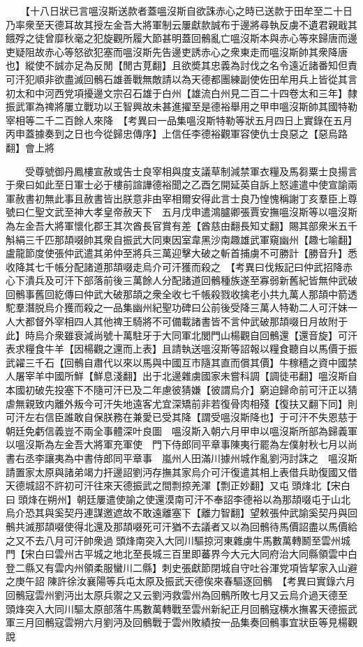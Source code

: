 　　【十八日狀已言嗢沒斯送款者蓋嗢沒斯自欲誅赤心之時已送款于田牟至二十日乃率衆至天德耳故其授左金吾大將軍制云屢獻款誠布于邊將尋執反虜不遺君親戢其餓殍之徒曾靡秋毫之犯旋觀所履大節甚明蓋回鶻亂亡嗢沒斯本與赤心等來歸唐而邊吏疑阻故赤心等怒欲犯塞而嗢沒斯先告邊吏誘赤心之衆東走而嗢沒斯帥其衆降唐也】縱使不誠亦足為反閒【閒古莧翻】且欲奬其忠義為討伐之名令遠近諸番知但責可汗犯順非欲盡滅回鶻石雄善戰無敵請以為天德都團練副使佐田牟用兵上皆從其言初太和中河西党項擾邊文宗召石雄于白州【雄流白州見二百二十四卷太和三年】隸振武軍為禆將屢立戰功以王智興故未甚進擢至是德裕舉用之甲申嗢沒斯帥其國特勒宰相等二千二百餘人來降　【考異曰一品集嗢沒斯特勒等狀五月四日上實錄在五月丙申蓋據奏到之日也今從歸忠傳序】上信任李德裕觀軍容使仇士良惡之【惡烏路翻】會上將

　　受尊號御丹鳳樓宣赦或告士良宰相與度支議草制減禁軍衣糧及馬芻粟士良揚言于衆曰如此至日軍士必于樓前諠譁德裕聞之乙酉乞開延英自訴上怒遽遣中使宣諭兩軍赦書初無此事且赦書皆出朕意非由宰相爾安得此言士良乃惶愧稱謝丁亥羣臣上尊號曰仁聖文武至神大孝皇帝赦天下　五月戊申遣鴻臚卿張賈安撫嗢沒斯等以嗢沒斯為左金吾大將軍懷化郡王其次酋長官賞有差【酋慈由翻長知丈翻】賜其部衆米五千斛絹三千匹那頡啜帥其衆自振武大同東因室韋黑沙南趣雄武軍窺幽州【趣七喻翻】盧龍節度使張仲武遣其弟仲至將兵三萬迎擊大破之斬首捕虜不可勝計【勝音升】悉收降其七千帳分配諸道那頡啜走烏介可汗獲而殺之　【考異曰伐叛記曰仲武招降赤心下潰兵及可汗下部落前後三萬餘人分配諸道回鶻種族遂至寡弱新舊紀皆無仲武破回鶻事舊回紇傳曰仲武大破那頡之衆全收七千帳殺戮收擒老小共九萬人那頡中箭透駝羣潛脱烏介獲而殺之一品集幽州紀聖功碑曰公前後受降三萬人特勒二人可汗妹一人大都督外宰相四人其他禆王騎將不可備載諸書皆不言仲武破那頡啜日月故附于此】時烏介衆雖衰減尚號十萬駐牙于大同軍北閭門山楊觀自回鶻還【還音旋】可汗表求糧食牛羊【因楊觀之還而上表】且請執送嗢沒斯等詔報以糧食聽自以馬價于振武糴三千石【回鶻自肅代以來以馬與中國互市隨其直而償其價】牛稼穡之資中國禁人屠宰羊中國所鮮【鮮息淺翻】出于北邊雜虜國家未嘗科調【調徒弔翻】嗢沒斯自本國初破先投塞下不隨可汗已及二年慮彼猜嫌【彼謂烏介】窮迫歸命前可汗正以猜虐無親致内離外叛今可汗失地遠客尤宜深矯前非若復骨肉相殘【復扶又翻下同】則可汗左右信臣誰敢自保朕務在兼愛已受其降【謂受嗢沒斯降也】于可汗不失恩慈于朝廷免虧信義豈不兩全事體深叶良圖　嗢沒斯入朝六月甲申以嗢沒斯所部為歸義軍以嗢沒斯為左金吾大將軍充軍使　門下侍郎同平章事陳夷行罷為左僕射秋七月以尚書右丞李讓夷為中書侍郎同平章事　嵐州人田滿川據州城作亂劉沔討誅之　嗢沒斯請置家太原與諸弟竭力扞邊詔劉沔存撫其家烏介可汗復遣其相上表借兵助復國又借天德城詔不許初可汗往來天德振武之間剽掠羌渾【剽正妙翻】又屯頭烽北【宋白曰頭烽在朔州】朝廷屢遣使諭之使還漠南可汗不奉詔李德裕以為那頡啜屯于山北烏介恐其與奚契丹連謀邀遮故不敢遠離塞下【離力智翻】望敕張仲武諭奚契丹與回鶻共滅那頡啜使得北還及那頡啜死可汗猶不去議者又以為回鶻待馬價詔盡以馬價給之又不去八月可汗帥衆過頭烽南突入大同川驅掠河東雜虜牛馬數萬轉鬭至雲州城門【宋白曰雲州古平城之地北至長城三百里即蕃界今大元大同府治大同縣領雲中白登二縣又有雲内州領柔服蠻川二縣】刺史張獻節閉城自守吐谷渾党項皆挈家入山避之庚午詔陳許徐汝襄陽等兵屯太原及振武天德俟來春驅逐回鶻　【考異曰實錄六月回鶻寇雲州劉沔出太原兵禦之又云劉沔救雲州為回鶻所敗七月又云烏介過天德至頭烽突入大同川驅太原部落牛馬數萬轉戰至雲州新紀正月回鶻寇横水撫畧天德振武軍三月回鶻寇雲朔六月劉沔及回鶻戰于雲州敗績按一品集奏回鶻事宜狀臣等見楊觀說